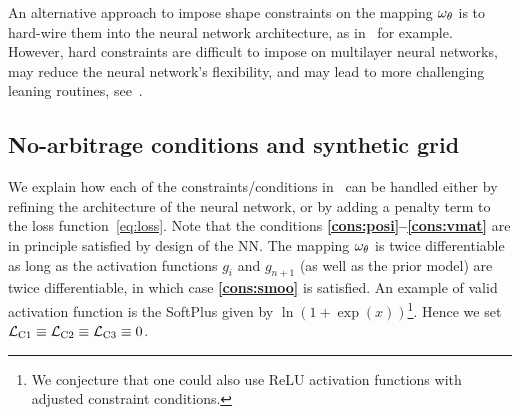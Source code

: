 \begin{remark}
An alternative approach to impose shape constraints on the mapping $\omega_{\theta}$ is to hard-wire them into the neural network architecture, as in~\cite{dugas2001incorporating} for example.
However, hard constraints are difficult to impose on multilayer neural networks, may reduce the neural network's flexibility, and may lead to more challenging leaning routines, see~\cite{marquez2017imposing}.
\end{remark}

\subsection{No-arbitrage conditions and synthetic grid} \label{sec:noarb}

We explain how each of the constraints/conditions in~ can be handled either by refining the architecture of the neural network, or by adding a penalty term to the loss function~\eqref{eq:loss}.
Note that the conditions \textbf{\ref{cons:posi}--\ref{cons:vmat}} are in principle satisfied by design of the NN.
The mapping $\omega_{\theta}$ is twice differentiable as long as the activation functions $g_i$ and $g_{n+1}$ (as well as the prior model) are twice differentiable, in which case\textbf{ \ref{cons:smoo}} is satisfied.
An example of valid activation function is the SoftPlus given by $\ln(1+\exp(x))$\footnote{We conjecture that one could also use ReLU activation functions with adjusted constraint conditions.}.
Hence we set ${\mathcal L}_{\rm C1} \equiv {\mathcal L}_{\rm C2}\equiv{\mathcal L}_{\rm C3}\equiv 0$.

